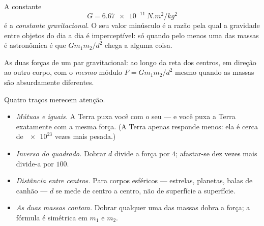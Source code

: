 \begin{definition}\label{def:g10:universal-gravitation:constant}
A constante
\[
G = \qty{6.67e-11}{N.m^2/kg^2}
\]
é a \emph{constante gravitacional}. O seu
valor minúsculo é a razão pela qual a gravidade entre objetos do dia a
dia é imperceptível: só quando pelo menos uma das massas é astronômica é
que $G m_1 m_2 / d^2$ chega a alguma coisa.
\end{definition}

\begin{omfigure}

{\small As duas forças de um par gravitacional: ao longo da reta dos
centros, em direção ao outro corpo, com o \emph{mesmo} módulo
$F = G m_1 m_2 / d^2$ mesmo quando as massas são absurdamente
diferentes.}
\end{omfigure}

\begin{remark}\label{rem:g10:universal-gravitation:reading}
Quatro traços merecem atenção.
\begin{itemize}
  \item \emph{Mútuas e iguais.} A Terra puxa você com o seu  --- e
        você puxa a Terra exatamente com a mesma força. (A Terra apenas
        responde menos: ela é cerca de $\num{e23}$ vezes mais pesada.)
  \item \emph{Inverso do quadrado.} Dobrar $d$ divide a força por $4$;
        afastar-se dez vezes mais divide-a por $100$.
  \item \emph{Distância entre centros.} Para corpos esféricos ---
        estrelas, planetas, balas de canhão --- $d$ se mede de centro a
        centro, não de superfície a superfície.
  \item \emph{As duas massas contam.} Dobrar qualquer uma das massas
        dobra a força; a fórmula é simétrica em $m_1$ e $m_2$.
\end{itemize}
\end{remark}

